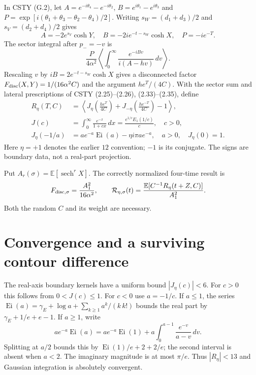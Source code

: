 \documentclass[11pt,a4paper]{article}
\newcommand{\E}{\mathbb E}
\begin{document}
In CSTY (G.2), let $A=e^{-i\theta_4}-e^{-i\theta_2}$,
$B=e^{i\theta_1}-e^{i\theta_3}$ and
$P=\exp[i(\theta_1+\theta_3-\theta_2-\theta_4)/2]$.
Writing $s_W=(d_1+d_3)/2$ and $s_V=(d_2+d_4)/2$ gives
\[
 A=-2e^{s_V}\cosh Y,\quad
 B=-2ie^{-t-s_W}\cosh X,\quad P=-ie^{-T}.
\]
The sector integral after $p_-=-v$ is
\[
 \frac{P}{4\alpha^2}
 \left\langle\int_0^\infty\frac{e^{-iBv}}{i(A-hv)}\,dv\right\rangle .
\]
Rescaling $v$ by $iB=2e^{-t-s_W}\cosh X$ gives a disconnected factor
$F_{\rm disc}(X,Y)=1/(16\alpha^2C)$ and the argument $he^T/(4C)$.
With the sector sum and lateral prescriptions of CSTY
(2.25)--(2.26), (2.33)--(2.35), define
\begin{align}
 R_\eta(T,C)&=\left\langle
 J_\eta\left(\frac{he^T}{4C}\right)
 +J_{-\eta}\left(\frac{he^{-T}}{4C}\right)-1\right\rangle,\label{R}\\
 J(c)&=\int_0^\infty\frac{e^{-x}}{1+cx}\,dx
      =\frac{e^{1/c}E_1(1/c)}c,\quad c>0,\nonumber\\
 J_\eta(-1/a)&=ae^{-a}\operatorname{Ei}(a)-\eta i\pi ae^{-a},
 \quad a>0,\quad J_\eta(0)=1.\nonumber
\end{align}
Here $\eta=+1$ denotes the earlier $12$ convention; $-1$ is its
conjugate. The signs are boundary data, not a real-part projection.

Put $A_r(\sigma)=\E[\operatorname{sech}^rX]$. The correctly normalized
four-time result is
\begin{equation}
 F_{{\rm disc},\sigma}=\frac{A_1^2}{16\alpha^2},\qquad
 {\cal R}_{\eta,\sigma}(t)
  =\frac{\E[C^{-1}R_\eta(t+Z,C)]}{A_1^2}.
 \label{smear}
\end{equation}
Both the random $C$ and its weight are necessary.

\newpage
\section{Convergence and a surviving contour difference}
The real-axis boundary kernels have a uniform bound $|J_\eta(c)|<6$.
For $c>0$ this follows from $0<J(c)\le1$.
For $c<0$ use $a=-1/c$.
If $a\le1$, the series
$\operatorname{Ei}(a)=\gamma_E+\log a+\sum_{k\ge1}a^k/(k\,k!)$
bounds the real part by $\gamma_E+1/e+e-1$.
If $a\ge1$, write
\[
 ae^{-a}\operatorname{Ei}(a)
 =ae^{-a}\operatorname{Ei}(1)
   +a\int_0^{a-1}\frac{e^{-v}}{a-v}\,dv .
\]
Splitting at $a/2$ bounds this by
$\operatorname{Ei}(1)/e+2+2/e$; the second interval is absent when
$a<2$. The imaginary magnitude is at most $\pi/e$.
Thus $|R_\eta|<13$ and Gaussian integration is absolutely convergent.
\end{document}
